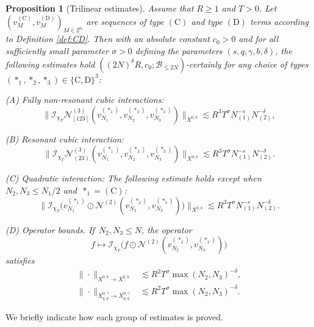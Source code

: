 \documentclass[11pt,reqno,english]{amsart}
\numberwithin{equation}{section}
\theoremstyle{plain}
\newtheorem{proposition}[theorem]{Proposition}
\theoremstyle{definition}
\theoremstyle{remark}
\newcommand{\N}{\mathbb{N}}
\newcommand{\dotcirc}{\mathbin{\odot}}
\begin{document}
\begin{proposition}[Trilinear estimates]
	\label{prop:trilinear}
 Assume that $R\geq 1$ and $T>0$. Let $(v_M^{(\mathrm{C})}, v_M^{(\mathrm{D})})_{M\in 2^{\N}}$ are sequences of type $(\mathrm{C})$ and type $(\mathrm{D})$ terms according to Definition \ref{def:CD}.
 Then with an absolute constant $c_0>0$ and for all sufficiently small parameter $\sigma>0$ defining the parameters $(s,q,\gamma,b,\delta)$, the following estimates hold
	$((2N)^{\delta}R,c_0;\mathcal{B}_{\leq2N})$-certainly for any choice of types~$(\ast_1,\ast_2,\ast_3)\in\{\mathrm{C},\mathrm{D}\}^3$:

	\emph{(A) Fully non-resonant cubic interactions:}
	\begin{equation}
		\label{eq:tri-cubic}
		\big\|\mathcal{I}_{\chi_T}\mathcal{N}_{[123]}^{(3)}
		(v_{N_1}^{(\ast_1)},v_{N_2}^{(\ast_2)},v_{N_3}^{(\ast_3)})\big\|_{X^{0,b}}
		\lesssim R^3T^{\sigma}N_{(1)}^{-s}N_{(2)}^{-\delta},
	\end{equation}

	\emph{(B) Resonant cubic interaction:}
	\begin{equation}
		\label{eq:tri-res}
		\big\|\mathcal{I}_{\chi_T}\mathcal{N}_{(23)}^{(3)}
		(v_{N_1}^{(\ast_{1})},v_{N_2}^{(\ast_{2})},v_{N_3}^{(\ast_{3})})\big\|_{X^{0,b}}
		\lesssim R^3T^{\sigma}N_{(1)}^{-s}N_{(2)}^{-\delta}.
	\end{equation}

	\emph{(C) Quadratic interaction:} The following estimate holds except when~$N_2,N_3\leq N_1/2$ and~$\ast_1=\mathrm{(C)}$:
	\begin{equation}
		\label{eq:circ}
		\big\|\mathcal{I}_{\chi_T}\big(
		v_{N_1}^{(\ast_{1})}\dotcirc\mathcal{N}^{(2)}(v_{N_2}^{(\ast_{2})},v_{N_3}^{(\ast_{3})})
		\big)\big\|_{X^{0,b}}
		\lesssim R^3T^{\sigma}N_{(1)}^{-s}N_{(2)}^{-\delta}.
	\end{equation}

	\emph{(D) Operator bounds.}
	If~$N_2,N_3\leq N$, the operator
	\[
	f \longmapsto \mathcal{I}_{\chi_T}\big(
	f\dotcirc\mathcal{N}^{(2)}(v_{N_2}^{(\ast_{2})},v_{N_3}^{(\ast_{3})})
	\big)
	\]
	satisfies
	\begin{align}
		\label{eq:op-X}
		\| \cdot \|_{X^{0,b}\to X^{0,b}}
		&\lesssim R^2T^{\sigma}\max(N_2,N_3)^{-\delta},\\
		\label{eq:op-FL}
		\| \cdot \|_{X_{q,q}^{0,\gamma}\to X_{q,q}^{0,\gamma}}
		&\lesssim R^2T^{\sigma}\max(N_2,N_3)^{-\delta}.
	\end{align}
\end{proposition}
We briefly indicate how each group of estimates is proved.
\end{document}
